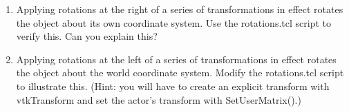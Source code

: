 \begin{enumerate}
\begin{enumerate}
\item Applying rotations at the right of a series of transformations in effect rotates the object about its own coordinate system. Use the rotations.tcl script to verify this. Can you explain this?

\item Applying rotations at the left of a series of transformations in effect rotates the object about the world coordinate system. Modify the rotations.tcl script to illustrate this. (Hint: you will have to create an explicit transform with vtkTransform and set the actor's transform with SetUserMatrix().)

\end{enumerate}

\end{enumerate}
